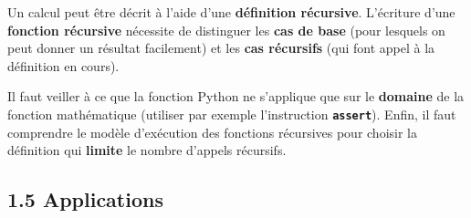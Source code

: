 \documentclass[a4paper,17pt]{extarticle}
\begin{document}
Un calcul peut être décrit à l'aide d'une \textbf{définition récursive}.
L'écriture d'une \textbf{fonction récursive} nécessite de distinguer les
\textbf{cas de base} (pour lesquels on peut donner un résultat
facilement) et les \textbf{cas récursifs} (qui font appel à la
définition en cours).

Il faut veiller à ce que la fonction Python ne s'applique que sur le
\textbf{domaine} de la fonction mathématique (utiliser par exemple
l'instruction \textbf{\texttt{assert}}). Enfin, il faut comprendre le
modèle d'exécution des fonctions récursives pour choisir la définition
qui \textbf{limite} le nombre d'appels récursifs.

    \hypertarget{applications}{%
\subsection{1.5 Applications}\label{applications}}
\end{document}
